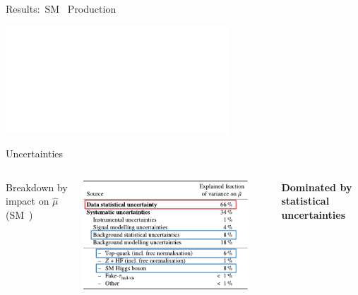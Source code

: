 \documentclass[11pt, xcolor={dvipsnames}, aspectratio=169]{beamer}
\begin{document}
\begin{frame}[standout]
  Results:~SM~\allbold{\HH} Production

  \vspace*{1.5em}

  \includegraphics[scale=1.0]{feynman_graphs/di_higgs_box_inverted}%
  \hspace*{2em}%
\end{frame}


\begin{frame}{Uncertainties}
  \begin{columns}
    \centering

    Breakdown by impact on $\hat{\mu}$ (SM~\HH)

    \vspace*{1.0em}

    \includegraphics[width=0.9\textwidth]{uncertainty_table}


    \textbf{Dominated by statistical uncertainties}
  \end{columns}
\end{frame}
\end{document}
